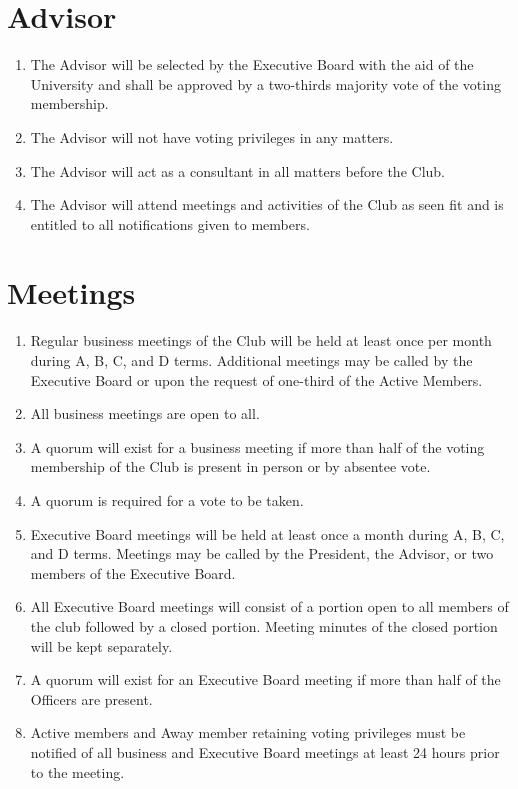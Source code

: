 \documentclass[12pt,letterpaper,oneside]{book}
\begin{document}
\chapter{Advisor}

\begin{enumerate}

\item The Advisor will be selected by the Executive Board with the aid of the University and shall be approved by a two-thirds majority vote of the voting membership.
\item The Advisor will not have voting privileges in any matters.
\item The Advisor will act as a consultant in all matters before the Club.
\item The Advisor will attend meetings and activities of the Club as seen fit and is entitled to all notifications given to members.

\end{enumerate}

\chapter{Meetings} \label{chap:meetings}

\begin{enumerate}

\item Regular business meetings of the Club will be held at least once per month during A, B, C, and D terms. Additional meetings may be called by the Executive Board or upon the request of one-third of the Active Members.
\item All business meetings are open to all.
\item A quorum will exist for a business meeting if more than half of the voting membership of the Club is present in person or by absentee vote.
\item A quorum is required for a vote to be taken.
\item Executive Board meetings will be held at least once a month during A, B, C, and D terms. Meetings may be called by the President, the Advisor, or two members of the Executive Board.
\item \label{itm:closedmeetings} All Executive Board meetings will consist of a portion open to all members of the club followed by a closed portion. Meeting minutes of the closed portion will be kept separately.
\item A quorum will exist for an Executive Board meeting if more than half of the Officers are present.
\item Active members and Away member retaining voting privileges must be notified of all business and Executive Board meetings at least 24 hours prior to the meeting.

\end{enumerate}
\end{document}
